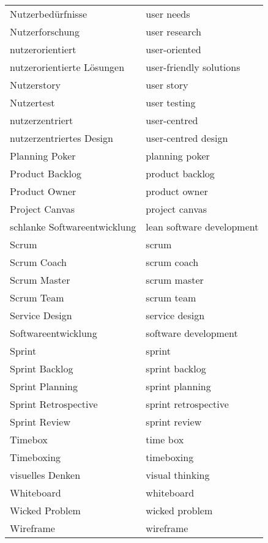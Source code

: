 \begin{spacing}{.5}
\begin{longtable}{ p{} p{}}
    Nutzerbedürfnisse & user needs \\
    Nutzerforschung & user research \\
    nutzerorientiert & user-oriented \\
    nutzerorientierte Lösungen & user-friendly solutions \\
    Nutzerstory & user story \\
    Nutzertest & user testing \\
    nutzerzentriert & user-centred \\
    nutzerzentriertes Design & user-centred design \\
    Planning Poker & planning poker \\
    Product Backlog & product backlog \\
    Product Owner & product owner \\
    Project Canvas & project canvas \\
    schlanke Softwareentwicklung & lean software development \\
    Scrum & scrum \\
    Scrum Coach & scrum coach \\
    Scrum Master & scrum master \\
    Scrum Team & scrum team \\
    Service Design & service design \\
    Softwareentwicklung & software development \\
    Sprint & sprint \\
    Sprint Backlog & sprint backlog \\
    Sprint Planning & sprint planning \\
    Sprint Retrospective & sprint retrospective \\
    Sprint Review & sprint review \\
    Timebox & time box \\
    Timeboxing & timeboxing \\
    visuelles Denken & visual thinking \\
    Whiteboard & whiteboard \\
    Wicked Problem & wicked problem \\
    Wireframe & wireframe \\
    \hline
\end{longtable}
\end{spacing}
\endgroup


\newpage

